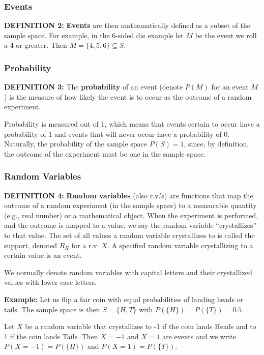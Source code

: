 \documentclass[12pt]{extarticle}
\begin{document}
            \subsubsection{Events}
                \textbf{DEFINITION 2:} \textbf{Events} are then mathematically defined as a subset of the sample space. For example, in the 6-sided die example let $M$ be the event we roll a 4 or greater. Then $M = \{4, 5, 6\} \subseteq S$.

            \subsubsection{Probability}
                \textbf{DEFINITION 3:} The \textbf{probability} of an event (denote $P(M)$ for an event $M$) is the measure of how likely the event is to occur as the outcome of a random experiment.
                
                Probability is measured out of 1, which means that events certain to occur have a probability of 1 and events that will never occur have a probability of 0. Naturally, the probability of the sample space $P(S) = 1$, since, by definition, the outcome of the experiment must be one in the sample space.
            
            \subsubsection{Random Variables}
                \textbf{DEFINITION 4:} \textbf{Random variables} (also r.v.'s) are functions that map the outcome of a random experiment (in the sample space) to a measurable quantity (e.g., real number) or a mathematical object. When the experiment is performed, and the outcome is mapped to a value, we say the random variable ``crystallizes'' to that value. The set of all values a random variable crystallizes to is called the support, denoted $R_X$ for a r.v. $X$. A specified random variable crystallizing to a certain value is an event.

                We normally denote random variables with capital letters and their crystallized values with lower case letters.
                
                \textbf{Example:} Let us flip a fair coin with equal probabilities of landing heads or tails. The sample space is then $S = \{H, T\}$ with $P(\{H\}) = P(\{T\}) = 0.5$.
                
                Let $X$ be a random variable that crystallizes to -1 if the coin lands Heads and to 1 if the coin lands Tails. Then $X = -1$ and $X = 1$ are events and we write $P(X = -1) = P(\{H\})$ and $P(X = 1) = P(\{T\})$.
\end{document}

